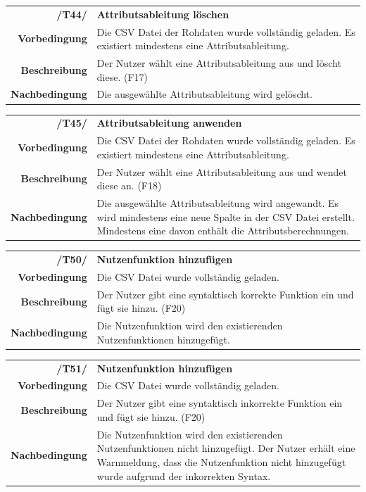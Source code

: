 \documentclass{article}
\begin{document}
\begin{table}[H]
\begin{tabularx}{\textwidth}{rX}
\textbf{/T44/}         & \textbf{Attributsableitung löschen} \\
\textbf{Vorbedingung}  & Die CSV Datei der Rohdaten wurde vollständig geladen. Es existiert mindestens eine Attributsableitung.  \\
\textbf{Beschreibung}  & Der Nutzer wählt eine Attributsableitung aus und löscht diese. (F17) \\
\textbf{Nachbedingung} & Die ausgewählte Attributsableitung wird gelöscht.
\end{tabularx}
\end{table}

\begin{table}[H]
\begin{tabularx}{\textwidth}{rX}
\textbf{/T45/}         & \textbf{Attributsableitung anwenden} \\
\textbf{Vorbedingung}  & Die CSV Datei der Rohdaten wurde vollständig geladen. Es existiert mindestens eine Attributsableitung.  \\
\textbf{Beschreibung}  & Der Nutzer wählt eine Attributsableitung aus und wendet diese an. (F18) \\
\textbf{Nachbedingung} & Die ausgewählte Attributsableitung wird angewandt. Es wird mindestens eine neue Spalte in der CSV Datei erstellt. Mindestens eine davon enthält die Attributsberechnungen.
\end{tabularx}
\end{table}

\begin{table}[H]
\begin{tabularx}{\textwidth}{rX}
\textbf{/T50/}         & \textbf{Nutzenfunktion hinzufügen} \\
\textbf{Vorbedingung}  & Die CSV Datei wurde vollständig geladen.   \\
\textbf{Beschreibung}  & Der Nutzer gibt eine syntaktisch korrekte Funktion ein und fügt sie hinzu. (F20) \\
\textbf{Nachbedingung} & Die Nutzenfunktion wird den existierenden Nutzenfunktionen hinzugefügt.
\end{tabularx}
\end{table}

\begin{table}[H]
\begin{tabularx}{\textwidth}{rX}
\textbf{/T51/}         & \textbf{Nutzenfunktion hinzufügen} \\
\textbf{Vorbedingung}  & Die CSV Datei wurde vollständig geladen.   \\
\textbf{Beschreibung}  & Der Nutzer gibt eine syntaktisch inkorrekte Funktion ein und fügt sie hinzu. (F20) \\
\textbf{Nachbedingung} & Die Nutzenfunktion wird den existierenden Nutzenfunktionen nicht hinzugefügt. Der Nutzer erhält eine Warnmeldung, dass die Nutzenfunktion nicht hinzugefügt wurde aufgrund der inkorrekten Syntax.
\end{tabularx}
\end{table}
\end{document}
